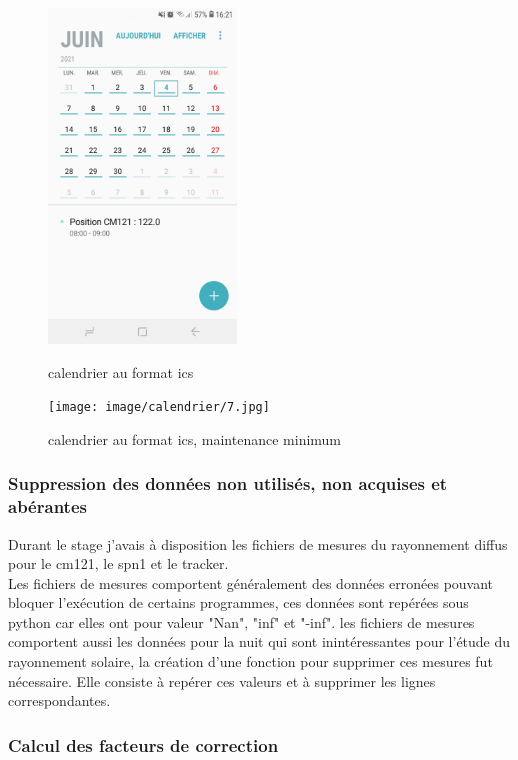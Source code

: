 \documentclass[12pt,a4paper]{article}
\begin{document}
\begin{flushleft}
\begin{figure}[H]
    \begin{minipage}[c]{.46\linewidth}
        \centering
        \includegraphics[width=5cm]{image/calendrier/4.jpg} 
		\caption{calendrier au format ics}
    \end{minipage}
    \hfill%
    \begin{minipage}[c]{.46\linewidth}
        \centering
        \texttt{[image: image/calendrier/7.jpg]} 
        \caption{calendrier au format ics, maintenance minimum}
    \end{minipage}
\end{figure}

\subsubsection{Suppression des données non utilisés, non acquises et abérantes}

Durant le stage j'avais à disposition les fichiers de mesures du rayonnement diffus pour le cm121, le spn1 et le tracker.\\
Les fichiers de mesures comportent généralement des données erronées pouvant bloquer l'exécution de certains programmes, ces données sont repérées sous python car elles ont pour valeur "Nan", "inf" et "-inf". les fichiers de mesures comportent aussi les données pour la nuit qui sont inintéressantes pour l'étude du rayonnement solaire, la création d'une fonction pour supprimer ces mesures fut nécessaire. Elle consiste à repérer ces valeurs et à supprimer les lignes correspondantes.

\subsubsection{Calcul des facteurs de correction}


\end{flushleft}
\end{document}
